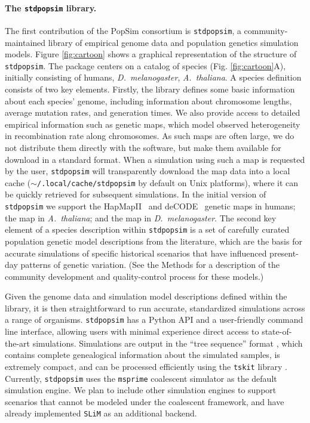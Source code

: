 \documentclass[12pt,halfline,a4paper]{ouparticle}
\newcommand{\stdpopsim}{\texttt{stdpopsim}\xspace}
\newcommand{\tskit}{\texttt{tskit}\xspace}
\begin{document}
\paragraph{The \stdpopsim library.}
The first contribution of the PopSim consortium is \stdpopsim, a
community-maintained library of empirical genome data and population genetics simulation
models. Figure \ref{fig:cartoon} shows a graphical
representation of the structure of \stdpopsim. The package centers
on a catalog of species (Fig. \ref{fig:cartoon}A), initially consisting of humans,
\emph{D.~melanogaster}, \emph{A.~thaliana}.
A species definition consists of two key elements.  Firstly, the library defines
some basic information about each species' genome, including information about chromosome
lengths, average mutation rates, and generation times. We also provide access to detailed
empirical information such as genetic maps, which model observed
heterogeneity in recombination rate along chromosomes. As such maps are often large,
we do not distribute them directly with the software, but make them available
for download in a standard format. When a simulation using such a map is
requested by the user, \stdpopsim will transparently download the map
data into a local cache (\texttt{$\sim$/.local/cache/stdpopsim} by default
on Unix platforms), where it can be quickly retrieved for subsequent
simulations.
In the initial version of \stdpopsim we support
the HapMapII~\citep{international2007second} and
deCODE~\citep{kong2010fine} genetic maps in humans;
the \cite{salome2011recombination} map in \emph{A.~thaliana};
and the \cite{comeron2012many} map in \emph{D.~melanogaster}.
The second key element of a species description
within \stdpopsim is a set of carefully curated population genetic model
descriptions from the literature, which are the basis for accurate simulations
of specific historical scenarios that have influenced present-day patterns of
genetic variation. (See the Methods for a description of the community
development and quality-control process for these models.)

Given the genome data and simulation model descriptions defined within the
library, it is then straightforward to run accurate, standardized simulations
across a range of organisms. \stdpopsim has a Python API and a user-friendly
command line interface, allowing users with minimal experience direct access to
state-of-the-art simulations. Simulations are output in the ``tree sequence''
format \citep{kelleher2016efficient,kelleher2018efficient,kelleher2019inferring}, which
contains complete genealogical information about the simulated samples, is
extremely compact, and can be processed efficiently using the \tskit library
\citep{kelleher2016efficient,kelleher2018efficient}. Currently,
\stdpopsim uses the  \texttt{msprime} coalescent simulator \citep{kelleher2016efficient}
as the default simulation engine. We plan to include other simulation
engines to support scenarios that cannot be modeled under the coalescent framework,
and have already implemented \texttt{SLiM} \citep{haller2019tree,haller2019slim} as
an additional backend.
\end{document}
